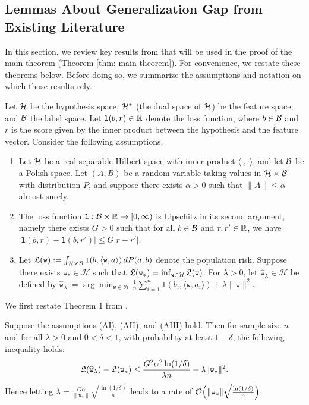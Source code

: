 \subsection{Lemmas About Generalization Gap from Existing Literature}

In this section, we review key results from \cite{della2021regularized} that will be used in the proof of the main theorem (Theorem \ref{thm: main theorem}). For convenience, we restate these theorems below. Before doing so, we summarize the assumptions and notation on which those results rely.

Let $\mathcal{H}$ be the hypothesis space, $\mathcal{H}^\star$ (the dual space of $\mathcal{H}$) be the feature space, and $\mathcal{B}$ the label space. Let $\mathtt{l}(b, r) \in \mathbb{R}$ denote the loss function, where $b \in \mathcal{B}$ and $r$ is the score given by the inner product between the hypothesis and the feature vector. Consider the following assumptions.


\begin{enumerate}
    \item[(AI)] Let $\mathcal{H}$ be a real separable Hilbert space with inner product $\langle \cdot, \cdot \rangle$, and let $\mathcal{B}$ be a Polish space.
    Let $(A, B)$ be a random variable taking values in $\mathcal{H} \times \mathcal{B}$ with distribution $P$, and suppose there exists $\alpha > 0$ such that $\|A\| \leq \alpha$ almost surely.   

    \item[(AII)] The loss function $\mathtt{l}: \mathcal{B} \times \mathbb{R} \rightarrow [0,\infty)$ is Lipschitz in its second argument, namely there exists $G > 0$ such that for all $b \in \mathcal{B}$ and $r,r' \in \mathbb{R}$, we have $|\mathtt{l}(b,r) - \mathtt{l}(b,r')| \leq G|r-r'|$.
    \item[(AIII)] Let $\mathfrak{L}(\mathtt{w}) := \int_{\mathcal{H} \times \mathcal{B}} \mathtt{l}(b, \langle \mathtt{w}, a \rangle) \, dP(a, b)$ denote the population risk. Suppose there exists $\mathtt{w}_* \in \mathcal{H}$ such that $\mathfrak{L}(\mathtt{w}_*) = \inf_{\mathtt{w} \in \mathcal{H}} \mathfrak{L}(\mathtt{w})$. For $\lambda > 0$, let $\widehat{\mathtt{w}}_\lambda \in \mathcal{H}$ be defined by $\widehat{\mathtt{w}}_\lambda := \arg\min_{\mathtt{w} \in \mathcal{H}} \frac{1}{n} \sum_{i=1}^n \mathtt{l}(b_i, \langle \mathtt{w}, a_i \rangle) + \lambda \|\mathtt{w}\|^2$.
\end{enumerate}


We first restate Theorem 1 from \cite{della2021regularized}.
\begin{lem}
Suppose the assumptions (AI), (AII), and (AIII) hold. Then for sample size $n$ and for all $\lambda > 0$ and $0 < \delta < 1$, with probability at least $1 - \delta$, the following inequality holds:
\begin{equation*}
    \mathfrak{L}(\widehat{\mathtt{w}}_\lambda) - \mathfrak{L}(\mathtt{w}_*) \leq \frac{G^2\alpha^2 \ln(1/\delta)}{\lambda n} + \lambda \|\mathtt{w}_*\|^2.
\end{equation*}
Hence letting $\lambda = \frac{G\alpha}{\|\mathtt{w}_*\|}\sqrt{\frac{\ln(1/\delta)}{n}}$ leads to a rate of $\mathcal{O}\Big(\|\mathtt{w}_*\|\sqrt{\frac{\ln(1/\delta)}{n}}\Big)$.
\end{lem}

